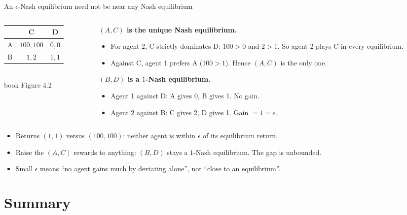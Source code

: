 \documentclass[aspectratio=169,11pt]{beamer}
\begin{document}
\begin{frame}{An $\epsilon$-Nash equilibrium need not be near any Nash equilibrium}
  \small
  \vspace{3mm}
  \begin{columns}[T]
    \begin{column}{0.36\textwidth}
      \centering
      \begin{tabular}{c|cc}
          & C & D \\ \hline
        A & \cellcolor{cgreen!25}$100,100$ & $0,0$ \\
        B & $1,2$ & \cellcolor{corange!25}$1,1$
      \end{tabular}\\[4pt]
      \small book Figure 4.2
    \end{column}
    \begin{column}{0.6\textwidth}
      \textbf{$(A,C)$ is the unique Nash equilibrium.}
      \begin{itemize}
        \item For agent 2, C strictly dominates D: $100 > 0$ and $2 > 1$. So agent 2 plays C in every equilibrium.
        \item Against C, agent 1 prefers A ($100 > 1$). Hence $(A,C)$ is the only one.
      \end{itemize}
      \textbf{$(B,D)$ is a $1$-Nash equilibrium.}
      \begin{itemize}
        \item Agent 1 against D: A gives 0, B gives 1. No gain.
        \item Agent 2 against B: C gives 2, D gives 1. Gain $= 1 = \epsilon$.
      \end{itemize}
    \end{column}
  \end{columns}
  \bigskip
  \begin{itemize}
    \item Returns $(1,1)$ versus $(100,100)$: neither agent is within $\epsilon$ of its equilibrium return.
    \item Raise the $(A,C)$ rewards to anything: $(B,D)$ stays a $1$-Nash equilibrium. The gap is unbounded.
    \item Small $\epsilon$ means ``no agent gains much by deviating alone'', not ``close to an equilibrium''.
  \end{itemize}
\end{frame}

\section{Summary}
\end{document}
